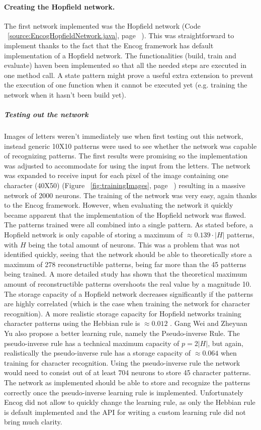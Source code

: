 \documentclass[pdftex,a4paper,12pt,twoside]{report}
\theoremstyle{plain} \newtheorem{theorem}{Theorem} \newtheorem{proposition}{Proposition} \newtheorem{lemma}{Lemma} \newtheorem*{corollary}{Corollary}
\theoremstyle{definition} \newtheorem{definition}{Definition} \newtheorem{conjecture}{Conjecture} \newtheorem*{example}{Example} \newtheorem{algorithm}{Algorithm}
\theoremstyle{remark} \newtheorem*{remark}{Remark} \newtheorem*{note}{Note} \newtheorem{case}{Case}
\begin{document}
\paragraph{Creating the Hopfield network.}
The first network implemented was the Hopfield network (Code ~\ref{source:EncogHopfieldNetwork.java}, page ~\pageref{source:EncogHopfieldNetwork.java}). This was straightforward to implement thanks to the fact that the Encog framework has default implementation of a Hopfield network. The functionalities (build, train and evaluate) haven been implemented so that all the needed steps are executed in one method call. A state pattern might prove a useful extra extension to prevent the execution of one function when it cannot be executed yet (e.g. training the network when it hasn't been build yet).
\subparagraph{Testing out the network}
Images of letters weren't immediately use  when first testing out this network, instead generic 10X10 patterns were used to see whether the network was capable of recognizing patterns. The first results were promising so the implementation was adjusted to accommodate for using the input from the letters. The network was expanded to receive input for each pixel of the image containing one character (40X50) (Figure ~\ref{fig:trainingImages}, page ~\pageref{fig:trainingImages}) resulting in a massive network of 2000 neurons. The training of the network was very easy, again thanks to the Encog framework. However, when evaluating the network it quickly became apparent that the implementation of the Hopfield network was flawed. The patterns trained were all combined into a single pattern. As stated before, a Hopfield network is only capable of storing a maximum of $\approx  0.139 \cdot |H|$ patterns, with $H$ being the total amount of neurons. This was a problem that was not identified quickly, seeing that the network should be able to theoretically store a maximum of 278 reconstructible patterns, being far more than the 45 patterns being trained. A more detailed study has shown that the theoretical maximum amount of reconstructible patterns overshoots the real value by a magnitude 10. The storage capacity of a Hopfield network decreases significantly if the patterns are highly correlated (which is the case when training the network for character recognition). A more realistic storage capacity for Hopfield networks training character patterns using the Hebbian rule is $\approx 0.012$ \citep{Gang}. Gang Wei and Zheyuan Yu also propose a better learning rule, namely the Pseudo-inverse Rule. The pseudo-inverse rule has a technical maximum capacity of $p = 2|H|$, but again, realistically the pseudo-inverse rule has a storage capacity of $\approx 0.064$ when training for character recognition. Using the pseudo-inverse rule the network would need to consist out of at least 704 neurons to store 45 character patterns. The network as implemented should be able to store and recognize the patterns correctly once the pseudo-inverse learning rule is implemented. Unfortunately Encog did not allow to quickly change the learning rule, as only the Hebbian rule is default implemented and the API for writing a custom learning rule did not bring much clarity.
\end{document}
